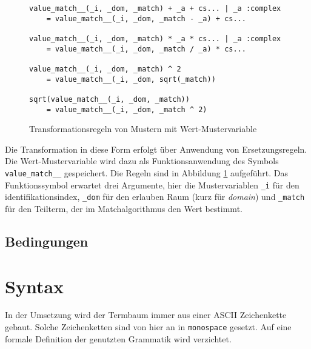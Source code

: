 \begin{figure}
\begin{verbatim}
value_match__(_i, _dom, _match) + _a + cs... | _a :complex 
    = value_match__(_i, _dom, _match - _a) + cs...
        
value_match__(_i, _dom, _match) * _a * cs... | _a :complex 
    = value_match__(_i, _dom, _match / _a) * cs...
        
value_match__(_i, _dom, _match) ^ 2                        
    = value_match__(_i, _dom, sqrt(_match))
        
sqrt(value_match__(_i, _dom, _match))                           
    = value_match__(_i, _dom, _match ^ 2)
\end{verbatim}
\label{figWertMusterBau}
\caption{Transformationsregeln von Mustern mit Wert-Mustervariable}
\end{figure}

Die Transformation in diese Form erfolgt über Anwendung von Ersetzungsregeln. Die Wert-Mustervariable wird dazu als Funktionsanwendung des Symbols \verb|value_match__| gespeichert. Die Regeln sind in Abbildung \ref{figWertMusterBau} aufgeführt. Das Funktionssymbol erwartet drei Argumente, hier die Mustervariablen \verb|_i| für den identifikationsindex, \verb|_dom| für den erlauben Raum (kurz für \emph{domain}) und \verb|_match| für den Teilterm, der im Matchalgorithmus den Wert bestimmt. 


\subsection{Bedingungen} \label{subsubsecBedingungen}

\section{Syntax} \label{subsecSyntax}
In der Umsetzung wird der Termbaum immer aus einer ASCII Zeichenkette gebaut.
Solche Zeichenketten sind von hier an in \texttt{monospace} gesetzt. Auf eine formale Definition der genutzten Grammatik wird verzichtet.

